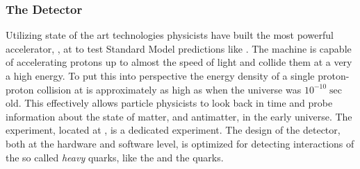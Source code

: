 \subsubsection{The \lhcb Detector}
Utilizing state of the art technologies physicists have built the most powerful accelerator, \lhc, at \cern
to test Standard Model predictions like \phis. The machine is capable of accelerating protons
up to almost the speed of light and collide them at a very a high energy. To put this into perspective
the energy density of a single proton-proton collision at \lhc is approximately as high as when the
universe was $10^{-10} \sec$ old. This effectively allows particle physicists to look back in time and
probe information about the state of matter, and antimatter, in the early universe.
The \lhcb experiment, located at \cern, is a dedicated experiment. The design of the detector,
both at the hardware and software level, is optimized for detecting interactions of the so called
{\it heavy} quarks, like the \bquark and the \cquark quarks.


